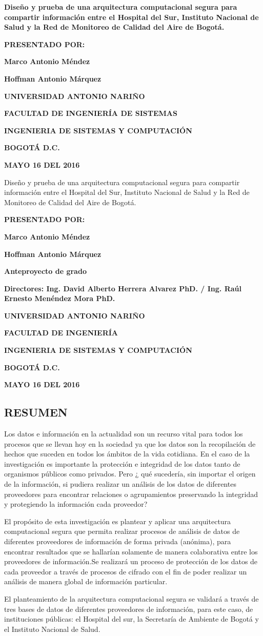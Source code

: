 \documentclass[a4paper, 12pt, oneside]{article}
\theoremstyle{definition}
\theoremstyle{remark}
\newcommand\portada{
\begin{titlepage}
		\begin{center}
			{\large \bf Diseño y prueba de una arquitectura computacional segura para compartir información entre el Hospital del Sur, Instituto Nacional de Salud y la Red de Monitoreo de Calidad del Aire de Bogotá.}
            
			\vfill
 			{\large\bf PRESENTADO POR: \par}
			{\large\bf Marco Antonio Méndez \par}
            {\large\bf Hoffman Antonio Márquez}
			\vfill
			{\large\bf UNIVERSIDAD ANTONIO NARIÑO  \par}
			{\large\bf FACULTAD DE INGENIERÍA DE SISTEMAS \par}
			{\large\bf INGENIERIA DE SISTEMAS Y COMPUTACIÓN \par}
			{\large\bf BOGOTÁ D.C.\par}
			{\large\bf MAYO 16 DEL 2016 \par}
		\end{center}
\end{titlepage}
}
\newcommand\contraportada{
	\begin{titlepage}
		\begin{center}
{Diseño y prueba de una arquitectura computacional segura para compartir información entre el Hospital del Sur, Instituto Nacional de Salud y la Red de Monitoreo de Calidad del Aire de Bogotá.} 
			\vfill
 			{\large\bf PRESENTADO POR: \par}
			{\large\bf Marco Antonio Méndez \par}
            {\large\bf Hoffman Antonio Márquez}
			\vfill
			{\large\bf Anteproyecto de grado \par}
			\vfill
			{\large\bf Directores: Ing. David Alberto Herrera Alvarez PhD. / Ing. Raúl Ernesto Menéndez Mora PhD. 
\par}
			\vfill
			{\large\bf UNIVERSIDAD ANTONIO NARIÑO \par}
			{\large\bf FACULTAD DE INGENIERÍA \par}
			{\large\bf INGENIERIA DE SISTEMAS Y COMPUTACIÓN \par}
			{\large\bf BOGOTÁ D.C.\par}
			{\large\bf MAYO 16 DEL 2016 \par}
		\end{center}
\end{titlepage}
}
\begin{document}
\portada
\contraportada
 




\renewcommand\contentsname{\centering TABLA DE CONTENIDOS}
\tableofcontents
\clearpage





\renewcommand{\thesection}{}
\renewcommand{\thesubsection}{\arabic{section}.\arabic{subsection}}
\makeatletter
\def\@seccntformat#1{\csname #1ignore\expandafter\endcsname\csname the#1\endcsname\quad}
\let\sectionignore\@gobbletwo
\let\latex@numberline\numberline
\def\numberline#1{\if\relax#1\relax\else\latex@numberline{#1}\fi}
\makeatother

\begin{center}
 \section{RESUMEN}
 \end{center}
 
Los datos e información en la actualidad son un recurso vital para todos los procesos que se llevan hoy en la sociedad ya que los datos son la recopilación de hechos que suceden en todos los ámbitos de la vida cotidiana. En el caso de la investigación es importante la protección e integridad de los datos tanto de organismos públicos como privados. Pero ¿ qué sucedería, sin importar el origen de la información, si pudiera realizar un análisis de los datos de diferentes proveedores para encontrar relaciones o agrupamientos preservando la integridad y protegiendo la información cada proveedor?

El propósito de esta investigación es plantear y aplicar una arquitectura computacional segura que permita realizar procesos de análisis de datos de diferentes proveedores de información de forma privada (anónima), para encontrar resultados que se  hallarían solamente de manera colaborativa entre los proveedores de información.Se realizará un proceso de protección de los datos de cada proveedor a través de procesos de cifrado con el fin de poder realizar un análisis de manera global de información particular. 

El planteamiento de la arquitectura computacional segura se validará a través de tres bases de datos de diferentes proveedores de información, para este caso, de instituciones públicas: el Hospital del sur, la Secretaría de Ambiente de Bogotá y el Instituto Nacional de Salud.
\end{document}
